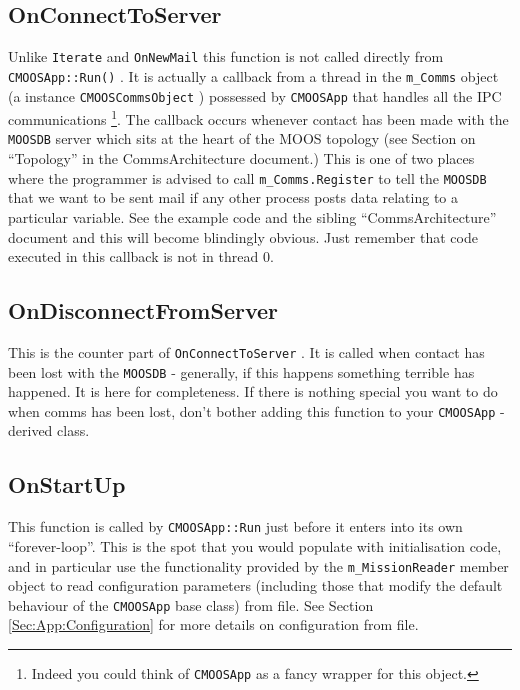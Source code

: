 \documentclass[a4paper,10pt]{article}
\newcommand{\Code}[1]{\texttt{#1} }
\newcommand{\code}[1]{\Code{#1} }
\begin{document}
\subsection{OnConnectToServer}\label{Sec:OnConnectToServer}

Unlike \code{Iterate} and \code{OnNewMail} this function is not
called directly from \code{CMOOSApp::Run()}. It is actually a
callback from a thread in the \code{m\_Comms} object (a instance
\code{CMOOSCommsObject}) possessed by \code{CMOOSApp} that handles
all the IPC communications \footnote{Indeed you could think of
\code{CMOOSApp} as a fancy wrapper for this object.}. The callback
occurs whenever contact has been made with the \code{MOOSDB}
server which sits at the heart of the MOOS topology (see Section on ``Topology'' in the CommsArchitecture document.)
This is one of two places where  the
programmer is advised to call \code{m\_Comms.Register} to tell the
\code{MOOSDB} that we want to be sent mail if any other process
posts data relating to a particular variable. See the example code
and the sibling ``CommsArchitecture'' document and this will become
blindingly obvious. Just remember that code executed in this
callback is not in thread 0.

\subsection{OnDisconnectFromServer}\label{Sec:OnDisconnectFromServer}
This is the counter part of \code{OnConnectToServer}. It is called
when contact has been lost with the \code{MOOSDB} - generally, if
this happens something terrible has happened. It is here for
completeness. If there is nothing special you want to do when
comms has been lost, don't bother adding this function to your
\code{CMOOSApp}-derived class.


\subsection{OnStartUp}\label{Sec:OnStartUp}

This function is called by \code{CMOOSApp::Run} just before it
enters into its own ``forever-loop''. This is the spot that you
would populate with initialisation code, and in particular use the
functionality provided by the \code{m\_MissionReader} member
object to read configuration parameters (including those that
modify the default behaviour of the  \code{CMOOSApp} base class)
from file. See Section \ref{Sec:App:Configuration} for more
details on configuration from file.
\end{document}
